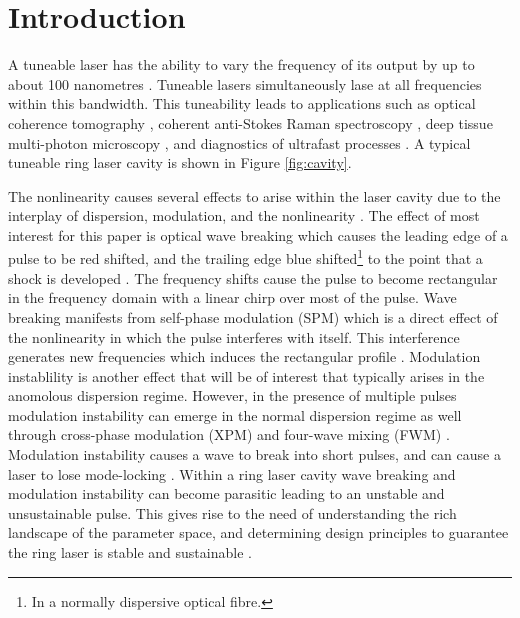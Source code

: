 \documentclass[10pt,twocolumn,a4paper]{article}
\title{}
\author{B. Metherall \and C. S. Bohun}
\begin{document}
\twocolumn[
	\begin{@twocolumnfalse}
		\maketitle
		\begin{abstract}

		\end{abstract}
	\end{@twocolumnfalse}
]

\section{Introduction}
\label{sec:intro}
A tuneable laser has the ability to vary the frequency of its output by up to about 100 nanometres \cite{bohun2015, burgoyne2010, yamashita2009}. Tuneable lasers simultaneously lase at all frequencies within this bandwidth. This tuneability leads to applications such as optical coherence tomography \cite{bohun2015, burgoyne2014, yamashita2009}, coherent anti-Stokes Raman spectroscopy \cite{burgoyne2014}, deep tissue multi-photon microscopy \cite{chung2017, liu2017}, and diagnostics of ultrafast processes \cite{burgoyne2014, silfvast2004}. A typical tuneable ring laser cavity is shown in Figure \ref{fig:cavity}.

The nonlinearity causes several effects to arise within the laser cavity due to the interplay of dispersion, modulation, and the nonlinearity \cite{bohun2015, coen1997, lapre2019, shao2019, woodward2018}. The effect of most interest for this paper is optical wave breaking which causes the leading edge of a pulse to be red shifted, and the trailing edge blue shifted\footnote{In a normally dispersive optical fibre.} to the point that a shock is developed \cite{anderson1992, rothenberg1989a, rothenberg1989b, tomlinson1984, tomlinson1985}. The frequency shifts cause the pulse to become rectangular in the frequency domain with a linear chirp over most of the pulse. Wave breaking manifests from self-phase modulation (SPM) which is a direct effect of the nonlinearity in which the pulse interferes with itself. This interference generates new frequencies which induces the rectangular profile \cite{agrawal2013, mollenauer1980, woodward2018}. Modulation instablility is another effect that will be of interest that typically arises in the anomolous dispersion regime. However, in the presence of multiple pulses modulation instability can emerge in the normal dispersion regime as well through cross-phase modulation (XPM) and four-wave mixing (FWM) \cite{agrawal1987, agrawal1989, agrawal2013, haelterman1992}. Modulation instability causes a wave to break into short pulses, and can cause a laser to lose mode-locking \cite{agrawal1987, coen1997, haelterman1992}. Within a ring laser cavity wave breaking and modulation instability can become parasitic leading to an unstable and unsustainable pulse. This gives rise to the need of understanding the rich landscape of the parameter space, and determining design principles to guarantee the ring laser is stable and sustainable \cite{bohun2015, burgoyneemail, finot2008, lapre2019, woodward2018}.
\end{document}
